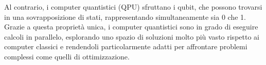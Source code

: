 Al contrario, i computer quantistici (QPU) sfruttano i qubit, che possono 
trovarsi in una sovrapposizione di stati, rappresentando simultaneamente 
sia 0 che 1. Grazie a questa proprietà unica, i computer quantistici 
sono in grado di eseguire calcoli in parallelo, esplorando uno spazio 
di soluzioni molto più vasto rispetto ai computer classici e rendendoli 
particolarmente adatti per affrontare problemi complessi come quelli di 
ottimizzazione.
